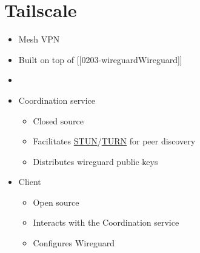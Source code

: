 \hypertarget{tailscale}{%
\section{Tailscale}\label{tailscale}}

\begin{itemize}
\tightlist
\item
  Mesh VPN
\item
  Built on top of {[}{[}0203-wireguard\textbar Wireguard{]}{]}
\item
\item
  Coordination service

  \begin{itemize}
  \tightlist
  \item
    Closed source
  \item
    Facilitates
    \href{notes/0202-nat\#Session\%20Traversal\%20Utilities\%20for\%20NAT\%20(STUN)}{STUN}/\href{notes/0202-nat}{TURN}
    for peer discovery
  \item
    Distributes wireguard public keys
  \end{itemize}
\item
  Client

  \begin{itemize}
  \tightlist
  \item
    Open source
  \item
    Interacts with the Coordination service
  \item
    Configures Wireguard
  \end{itemize}
\end{itemize}
